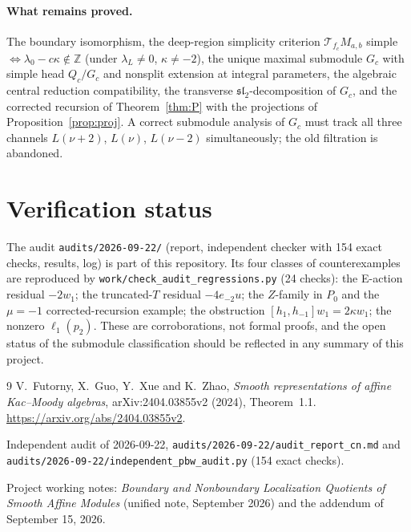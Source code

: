 \documentclass[11pt]{article}
\newcommand{\Z}{\mathbb Z}
\newcommand{\slc}{\mathfrak{sl}_2}
\begin{document}
\paragraph{What remains proved.}
The boundary isomorphism, the deep-region simplicity criterion
$\mathcal T_{f_c}M_{a,b}$ simple $\iff\lambda_0-c\kappa\notin\Z$ (under
$\lambda_L\ne0$, $\kappa\ne-2$), the unique maximal submodule $G_c$ with
simple head $Q_c/G_c$ and nonsplit extension at integral parameters, the
algebraic central reduction compatibility, the transverse
$\slc$-decomposition of $G_c$, and the corrected recursion of
Theorem~\ref{thm:P} with the projections of Proposition~\ref{prop:proj}.
A correct submodule analysis of $G_c$ must track all three channels
$L(\nu+2)$, $L(\nu)$, $L(\nu-2)$ simultaneously; the old filtration is
abandoned.

\section{Verification status}

The audit \texttt{audits/2026-09-22/} (report, independent checker with 154
exact checks, results, log) is part of this repository. Its four classes of
counterexamples are reproduced by \texttt{work/check\_audit\_regressions.py}
(24 checks): the E-action residual $-2w_1$; the truncated-$T$ residual
$-4e_{-2}u$; the $Z$-family in $P_0$ and the $\mu=-1$ corrected-recursion
example; the obstruction $[h_1,h_{-1}]w_1=2\kappa w_1$; the nonzero
$\ell_1(p_2)$. These are corroborations, not formal proofs, and the open
status of the submodule classification should be reflected in any summary
of this project.

\begin{thebibliography}{9}
V.~Futorny, X.~Guo, Y.~Xue and K.~Zhao,
\emph{Smooth representations of affine Kac--Moody algebras},
arXiv:2404.03855v2 (2024), Theorem~1.1.
\url{https://arxiv.org/abs/2404.03855v2}.

Independent audit of 2026-09-22,
\texttt{audits/2026-09-22/audit\_report\_cn.md} and
\texttt{audits/2026-09-22/independent\_pbw\_audit.py} (154 exact checks).

Project working notes: \emph{Boundary and Nonboundary Localization Quotients
of Smooth Affine Modules} (unified note, September 2026) and the addendum
of September 15, 2026.
\end{thebibliography}
\end{document}
